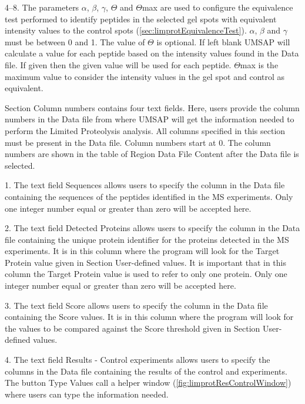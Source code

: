 \numrange[range-phrase = --]{4}{8}. The parameters $\alpha$, $\beta$, $\gamma$,
$\Theta$ and $\Theta$max are used to configure the equivalence test\cite{Limentani2005}
performed to identify peptides in the selected gel spots with equivalent intensity
values to the control spots (\autoref{sec:limprotEquivalenceTest}). $\alpha$, $\beta$ and 
$\gamma$ must be between \num{0} and \num{1}. The value of $\Theta$ is optional. If
left blank UMSAP will calculate a value for each peptide based on the intensity values
found in the Data file. If given then the given value will be used for each peptide.
$\Theta$max is the maximum value to consider the intensity values in the gel spot
and control as equivalent.

Section Column numbers contains four text fields. Here, users provide the column
numbers in the Data file from where UMSAP will get the information needed to perform
the Limited Proteolysis analysis. All columns specified in this section must be present
in the Data file. Column numbers start at \num{0}. The column numbers are shown in
the table of Region Data File Content after the Data file is selected.

\num{1}. The text field Sequences allows users to specify the column in the Data
file containing the sequences of the peptides identified in the MS experiments.
Only one integer number equal or greater than zero will be accepted here.

\num{2}. The text field Detected Proteins allows users to specify the column in
the Data file containing the unique protein identifier for the proteins detected
in the MS experiments. It is in this column where the program will look for the
Target Protein value given in Section User-defined values. It is important that
in this column the Target Protein value is used to refer to only one protein. Only
one integer number equal or greater than zero will be accepted here.

\num{3}. The text field Score allows users to specify the column in the Data file
containing the Score values. It is in this column where the program will look for
the values to be compared against the Score threshold given in Section User-defined
values.

\num{4}. \label{par:limprotResultControl}The text field Results - Control experiments
allows users to specify the columns in the Data file containing the results of the
control and experiments. The button Type Values call a helper window
(\autoref{fig:limprotResControlWindow}) where users can type the information needed. 

